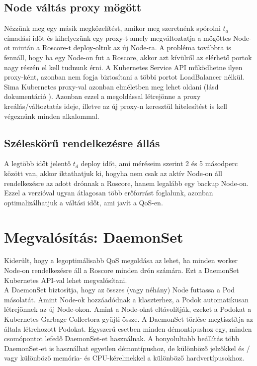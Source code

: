 \subsection{Node váltás proxy mögött}
Nézzünk meg egy másik megközelítést, amikor meg szeretnénk spórolni $t_a$ címadási időt és kihelyezünk egy proxy-t amely megváltoztatja a mögöttes Node-ot miután a Roscore-t deploy-oltuk az új Node-ra. A probléma továbbra is fennáll, hogy ha egy Node-on fut a Roscore, akkor azt kívülről az elérhető portok nagy részén el kell tudnunk érni. A Kubernetes Service API működhetne ilyen proxy-ként, azonban nem fogja biztosítani a többi portot LoadBalancer nélkül. Sima Kubernetes proxy-val azonban elméletben meg lehet oldani (lásd dokumentáció \cite{proxy}). Azonban ezzel a megoldással létrejönne a proxy kreálás/változtatás ideje, illetve az új proxy-n keresztül hitelesítést is kell végeznünk minden alkalommal. 

\subsection{Széleskörű rendelkezésre állás}
A legtöbb időt jelentő $t_d$ deploy időt, ami méréseim szerint 2 és 5 másodperc között van, akkor iktathatjuk ki, hogyha nem csak az aktív Node-on áll rendelkezésre az adott drónnak a Roscore, hanem legalább egy backup Node-on. Ezzel a verzióval ugyan átlagosan több erőforrást foglalunk, azonban optimalizálhatjuk a váltási időt, ami javít a QoS-en.

\section{Megvalósítás: DaemonSet}
Kiderült, hogy a legoptimálisabb QoS megoldása az lehet, ha minden worker Node-on rendelkezésre áll a Roscore minden drón számára. Ezt a DaemonSet Kubernetes API-val lehet megvalósítani. \\

\noindent
A DaemonSet biztosítja, hogy az összes (vagy néhány) Node futtassa a Pod másolatát. Amint  Node-ok hozzáadódnak a klaszterhez, a Podok automatikusan létrejönnek az új Node-okon. Amint a Node-okat eltávolítják, ezeket a Podokat a Kubernetes Garbage-Collectora gyűjti össze. A DaemonSet törlése megtisztítja az általa létrehozott Podokat. Egyszerű esetben minden démontípushoz egy, minden csomópontot lefedő DaemonSet-et használnak. A bonyolultabb beállítás több DaemonSet-et is használhat egyetlen démontípushoz, de különböző jelzőkkel és / vagy különböző memória- és CPU-kérelmekkel a különböző hardvertípusokhoz. \cite{daemonset} \\

